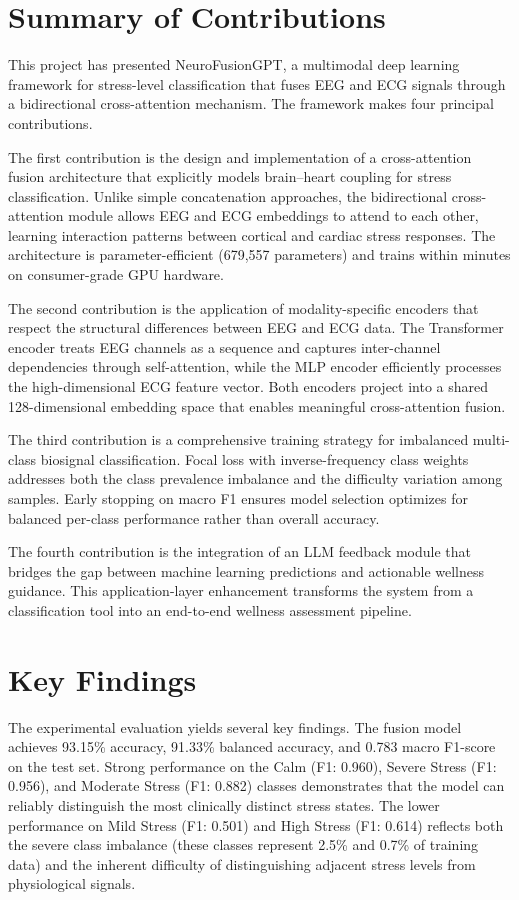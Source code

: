 \documentclass[12pt,letterpaper]{report}
\begin{document}
\section{Summary of Contributions}
\label{sec:contributions}

This project has presented NeuroFusionGPT, a multimodal deep learning framework for stress-level classification that fuses EEG and ECG signals through a bidirectional cross-attention mechanism. The framework makes four principal contributions.

The first contribution is the design and implementation of a cross-attention fusion architecture that explicitly models brain--heart coupling for stress classification. Unlike simple concatenation approaches, the bidirectional cross-attention module allows EEG and ECG embeddings to attend to each other, learning interaction patterns between cortical and cardiac stress responses. The architecture is parameter-efficient (679,557 parameters) and trains within minutes on consumer-grade GPU hardware.

The second contribution is the application of modality-specific encoders that respect the structural differences between EEG and ECG data. The Transformer encoder treats EEG channels as a sequence and captures inter-channel dependencies through self-attention, while the MLP encoder efficiently processes the high-dimensional ECG feature vector. Both encoders project into a shared 128-dimensional embedding space that enables meaningful cross-attention fusion.

The third contribution is a comprehensive training strategy for imbalanced multi-class biosignal classification. Focal loss with inverse-frequency class weights addresses both the class prevalence imbalance and the difficulty variation among samples. Early stopping on macro F1 ensures model selection optimizes for balanced per-class performance rather than overall accuracy.

The fourth contribution is the integration of an LLM feedback module that bridges the gap between machine learning predictions and actionable wellness guidance. This application-layer enhancement transforms the system from a classification tool into an end-to-end wellness assessment pipeline.

\section{Key Findings}
\label{sec:findings}

The experimental evaluation yields several key findings. The fusion model achieves 93.15\% accuracy, 91.33\% balanced accuracy, and 0.783 macro F1-score on the test set. Strong performance on the Calm (F1: 0.960), Severe Stress (F1: 0.956), and Moderate Stress (F1: 0.882) classes demonstrates that the model can reliably distinguish the most clinically distinct stress states. The lower performance on Mild Stress (F1: 0.501) and High Stress (F1: 0.614) reflects both the severe class imbalance (these classes represent 2.5\% and 0.7\% of training data) and the inherent difficulty of distinguishing adjacent stress levels from physiological signals.
\end{document}
